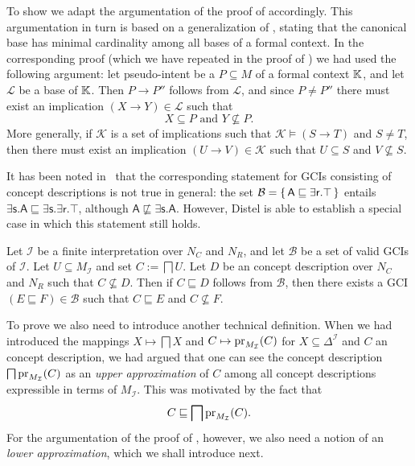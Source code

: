To show  we adapt the argumentation of the proof of
\cite[Theorem~5.18]{Diss-Felix} accordingly.  This argumentation in turn is based on a
generalization of , stating that
the canonical base has minimal cardinality among all bases of a formal context.  In the
corresponding proof (which we have repeated in the proof of
) we had used the following
argument: let pseudo-intent be a $P \subseteq M$ of a formal context ${\mathbb{K}}$, and let
$\mathcal{L}$ be a base of ${\mathbb{K}}$.  Then $P \to P''$ follows from $\mathcal{L}$, and
since $P \neq P''$ there must exist an implication $(X \to Y) \in \mathcal{L}$ such that
\begin{equation*}
  X \subseteq P \text{ and } Y \not\subseteq P.
\end{equation*}
More generally, if $\mathcal{K}$ is a set of implications such that $\mathcal{K} \models
(S \to T)$ and $S \neq T$, then there must exist an implication $(U \to V) \in
\mathcal{K}$ such that $U \subseteq S$ and $V \not\subseteq S$.

It has been noted in~\cite{Diss-Felix} that the corresponding statement for GCIs
consisting of \ELgfpbot concept descriptions is not true in general: the set $\mathcal{B}
= {\{\, \mathsf{A \sqsubseteq \exists r. \top} \,\}}$ entails $\mathsf{\exists s. A
  \sqsubseteq \exists s. \exists r. \top}$, although $\mathsf{A} \not\sqsubseteq
\mathsf{\exists s. A}$.  However, Distel is able to establish a special case in which this
statement still holds.

\begin{Lemma}
  \label{lem:Felix-5.16}
  Let $\mathcal{I}$ be a finite interpretation over $N_C$ and $N_R$, and let $\mathcal{B}$
  be a set of valid GCIs of $\mathcal{I}$.  Let $U \subseteq M_{\mathcal{I}}$ and set $C
  := \bigsqcap U$.  Let $D$ be an \ELgfpbot concept description over $N_C$ and $N_R$ such
  that $C \not\subseteq D$.  Then if $C \sqsubseteq D$ follows from $\mathcal{B}$, then
  there exists a GCI $(E \sqsubseteq F) \in \mathcal{B}$ such that $C \sqsubseteq E$ and
  $C \not\subseteq F$.
\end{Lemma}

To prove  we also need to introduce another technical
definition.  When we had introduced the mappings $X \mapsto \bigsqcap X$ and $C \mapsto
\operatorname{pr}_{M_{\mathcal{I}}}(C)$ for $X \subseteq \Delta^{\mathcal{I}}$ and $C$ an \ELgfpbot
concept description, we had argued that one can see the concept description $\bigsqcap
\operatorname{pr}_{M_{\mathcal{I}}}(C)$ as an \emph{upper approximation} of $C$ among all concept
descriptions expressible in terms of $M_{\mathcal{I}}$.  This was motivated by the fact that
\begin{equation*}
  C \sqsubseteq \bigsqcap \operatorname{pr}_{M_{\mathcal{I}}}(C).
\end{equation*}
For the argumentation of the proof of , however, we also
need a notion of an \emph{lower approximation}, which we shall introduce next.

